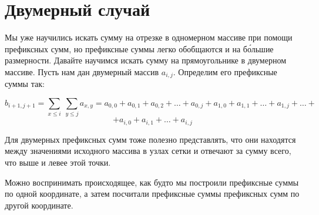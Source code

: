 \section{Двумерный случай}

Мы уже научились искать сумму на отрезке в одномерном массиве при помощи префиксных сумм, но префиксные суммы легко обобщаются и на б\'{о}льшие размерности. Давайте научимся искать сумму на прямоугольнике в двумерном массиве. Пусть нам дан двумерный массив $a_{i, j}$.
Определим его префиксные суммы так:

$$
b_{i + 1, j + 1} = \sum_{x \le i} \ \sum_{y \le j} a_{x, y} = a_{0, 0} + a_{0, 1} + a_{0, 2} + \ldots + a_{0, j} + a_{1, 0} + a_{1, 1} + \ldots + a_{1, j} + \ldots +
$$
$$
+a_{i, 0} + a_{i, 1} + \ldots + a_{i, j}
$$

Для двумерных префиксных сумм тоже полезно представлять, что они находятся между значениями исходного массива в узлах сетки и отвечают за сумму всего, что выше и левее этой точки.

Можно воспринимать происходящее, как будто мы построили префиксные суммы по одной координате, а затем посчитали префиксные суммы префиксных сумм по другой координате.


\


